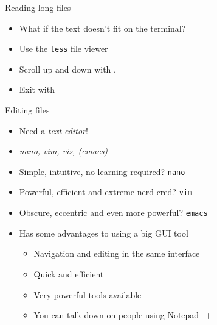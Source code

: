     \begin{frame}[t,fragile]{Reading long files}
        \begin{itemize}
            \item What if the text doesn't fit on the terminal?
            \item Use the \texttt{less} file viewer
            \item Scroll up and down with \keys{\arrowkeyup}, \keys{\arrowkeydown}
            \item Exit with 
        \end{itemize}
    \end{frame}

    \begin{frame}[t,fragile]{Editing files}
        \begin{itemize}
            \item Need a \emph{text editor}!
            \item \emph{nano, vim, vis, (emacs)}
            \item Simple, intuitive, no learning required? \textrightarrow\:\texttt{nano}
            \item Powerful, efficient and extreme nerd cred? \textrightarrow\:\texttt{vim}
            \item Obscure, eccentric and even more powerful? \textrightarrow\:\texttt{emacs}
            \item Has some advantages to using a big GUI tool
                \begin{itemize}
                    \item Navigation and editing in the same interface
                    \item Quick and efficient
                    \item Very powerful tools available
                    \item You can talk down on people using Notepad++
                \end{itemize}
        \end{itemize}
    \end{frame}

